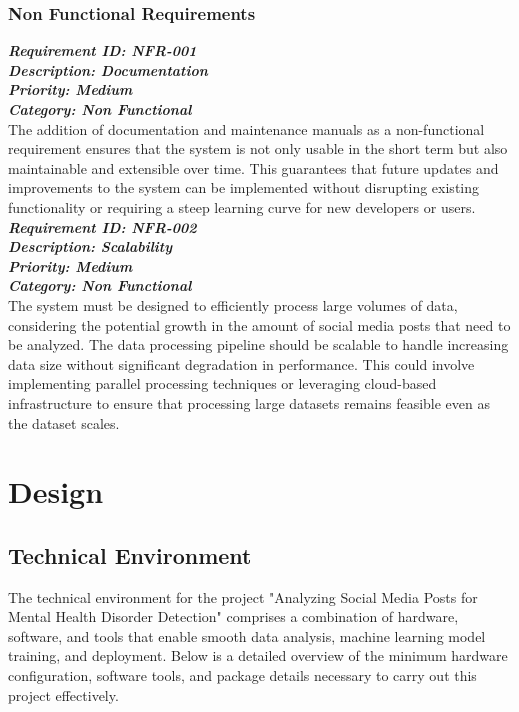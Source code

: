 \subsubsection{Non Functional Requirements}

\noindent
\textbf{\emph{Requirement ID: NFR-001}} \\ 
\textbf{\emph{Description: Documentation}} \\
\textbf{\emph{Priority: Medium}} \\
\textbf{\emph{Category: Non Functional}} \\
\noindent
The addition of documentation and maintenance manuals as a non-functional requirement ensures that the system is not only usable in the short term but also maintainable and extensible over time. This guarantees that future updates and improvements to the system can be implemented without disrupting existing functionality or requiring a steep learning curve for new developers or users. \\

\noindent
\textbf{\emph{Requirement ID: NFR-002}} \\ 
\textbf{\emph{Description:  Scalability}} \\
\textbf{\emph{Priority: Medium}} \\
\textbf{\emph{Category: Non Functional}} \\
\noindent
The system must be designed to efficiently process large volumes of data, considering the potential growth in the amount of social media posts that need to be analyzed. The data processing pipeline should be scalable to handle increasing data size without significant degradation in performance. This could involve implementing parallel processing techniques or leveraging cloud-based infrastructure to ensure that processing large datasets remains feasible even as the dataset scales. 






\section{Design}

\subsection{Technical Environment}
\noindent
The technical environment for the project "Analyzing Social Media Posts for Mental Health Disorder Detection" comprises a combination of hardware, software, and tools that enable smooth data analysis, machine learning model training, and deployment. Below is a detailed overview of the minimum hardware configuration, software tools, and package details necessary to carry out this project effectively. \\

